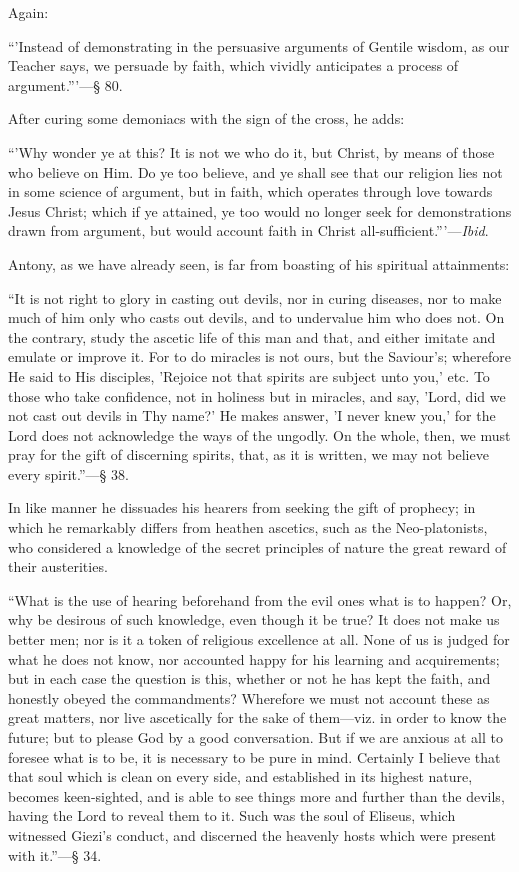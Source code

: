 Again:

``'Instead of demonstrating in the persuasive arguments of
Gentile wisdom, as our Teacher says, we persuade by faith, which
vividly anticipates a process of argument.'''—§ 80.

After curing some demoniacs with the sign of the cross, he adds:

``'Why wonder ye at this? It is not we who do it, but Christ,
by means of those who believe on Him. Do ye too believe, and ye shall
see that our religion lies not in some science of argument, but in
faith, which operates through love towards Jesus Christ; which if ye
attained, ye too would no longer seek for demonstrations drawn from
argument, but would account faith in Christ all-sufficient.'''—\emph{Ibid}.

Antony, as we have already seen, is far from boasting of his
spiritual attainments:

``It is not right to glory in casting out devils, nor in curing
diseases, nor to make much of him only who casts out devils, and to
undervalue him who does not. On the contrary, study the ascetic life
of this man and that, and either imitate and emulate or improve it.
For to do miracles is not ours, but the Saviour's; wherefore He said
to His disciples, 'Rejoice not that spirits are subject unto you,'
etc. To those who take confidence, not in holiness but in miracles,
and say, 'Lord, did we not cast out devils in Thy name?' He makes
answer, 'I never knew you,' for the Lord does not acknowledge the ways
of the ungodly. On the whole, then, we must pray for the gift of
discerning spirits, that, as it is written, we may not believe every
spirit.''—§ 38.

In like manner he dissuades his hearers from seeking the gift of
prophecy; in which he remarkably differs from heathen ascetics, such
as the Neo-platonists, who considered a knowledge of the secret
principles of nature the great reward of their austerities.

``What is the use of hearing beforehand from the evil ones what
is to happen? Or, why be desirous of such knowledge, even though it be
true? It does not make us better men; nor is it a token of religious
excellence at all. None of us is judged for what he does not know, nor
accounted happy for his learning and acquirements; but in each case
the question is this, whether or not he has kept the faith, and
honestly obeyed the commandments? Wherefore we must not account these
as great matters, nor live ascetically for the sake of them—viz. in
order to know the future; but to please God by a good conversation.
But if we are anxious at all to foresee what is to be, it is necessary
to be pure in mind. Certainly I believe that that soul which is clean
on every side, and established in its highest nature, becomes
keen-sighted, and is able to see things more and further than the
devils, having the Lord to reveal them to it. Such was the soul of
Eliseus, which witnessed Giezi's conduct, and discerned the heavenly
hosts which were present with it.''—§ 34.

